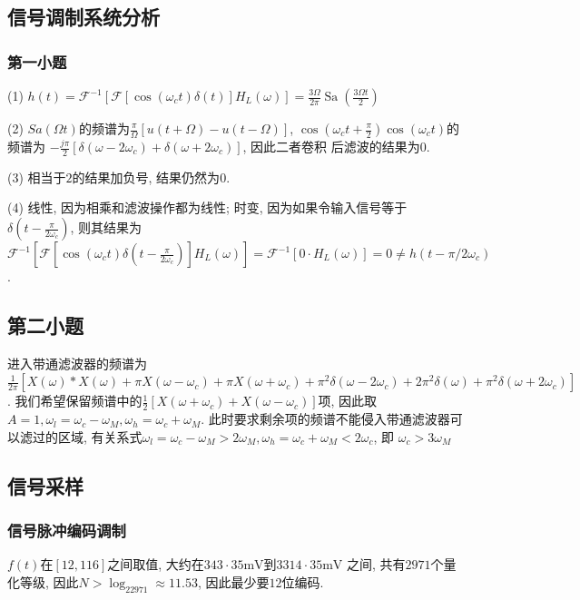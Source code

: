 \subsection{信号调制系统分析}

\subsubsection{第一小题}

(1) $h(t)=\mathcal{F}^{-1}[\mathcal{F}[\cos(\omega_ct)\delta(t)]H_L(\omega)]=
\displaystyle\frac{3\Omega}{2\pi}\operatorname{Sa}(\frac{3\Omega t}{2})$

(2) $Sa(\Omega t)$的频谱为$\frac{\pi}{\Omega}[u(t+\Omega)-u(t-\Omega)]$,
$\cos(\omega_c t + \frac{\pi}{2})\cos(\omega_ct)$的频谱为
$-\frac{j\pi}{2}[\delta(\omega-2\omega_c)+\delta(\omega+2\omega_c)]$, 因此二者卷积
后滤波的结果为$0$.

(3) 相当于$2$的结果加负号, 结果仍然为$0$.

(4) 线性, 因为相乘和滤波操作都为线性; 时变, 因为如果令输入信号等于
$\delta(t-\frac{\pi}{2\omega_c})$, 则其结果为
$\mathcal{F}^{-1}[\mathcal{F}[\cos(\omega_ct)
\delta(t-\frac{\pi}{2\omega_c})]H_L(\omega)]=\displaystyle\mathcal{F}^{-1}[0\cdot 
H_L(\omega)]=0\ne h(t-\pi/2\omega_c)$.

\subsection{第二小题}

进入带通滤波器的频谱为$\frac{1}{2\pi}[X(\omega)*X(\omega)+\pi X(\omega-\omega_c)
+\pi X(\omega+\omega_c)+\pi^2\delta(\omega-2\omega_c)+2\pi^2\delta(\omega)+
\pi^2\delta(\omega+2\omega_c)]$. 我们希望保留频谱中的$\frac{1}{2}[X(\omega+\omega_c)
+X(\omega-\omega_c)]$项, 因此取$A=1,\omega_l=\omega_c-\omega_M,\omega_h=\omega_c+
\omega_M$. 此时要求剩余项的频谱不能侵入带通滤波器可以滤过的区域, 有关系式$
\omega_l=\omega_c-\omega_M>2\omega_M,\omega_h=\omega_c+\omega_M<2\omega_c$, 即
$\omega_c>3\omega_M$

\subsection{信号采样}

\subsubsection{信号脉冲编码调制}

$f(t)$在$[12,116]$之间取值, 大约在$343\cdot35\mathrm{mV}$到$3314\cdot35\mathrm{mV}$
之间, 共有$2971$个量化等级, 因此$N>\log_22971\approx11.53$, 因此最少要$12$位编码.

